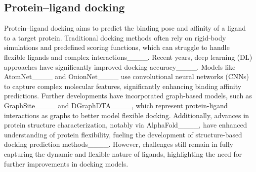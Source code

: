 \subsection{Protein–ligand docking}
Protein–ligand docking aims to predict the binding pose and affinity of a ligand to a target protein. 
Traditional docking methods often rely on rigid-body simulations and predefined scoring functions, which can struggle to handle flexible ligands and complex interactions____.
Recent years, deep learning (DL) approaches have significantly improved docking accuracy____. Models like AtomNet____ and OnionNet____ use convolutional neural networks (CNNs) to capture complex molecular features, significantly enhancing binding affinity predictions.
Further developments have incorporated graph-based models, such as GraphSite____ and DGraphDTA____, which represent protein-ligand interactions as graphs to better model flexible docking. 
Additionally, advances in protein structure characterization, notably via AlphaFold____, have enhanced understanding of protein flexibility, fueling the development of structure-based docking prediction methods____.
However, challenges still remain in fully capturing the dynamic and flexible nature of ligands, highlighting the need for further improvements in docking models.